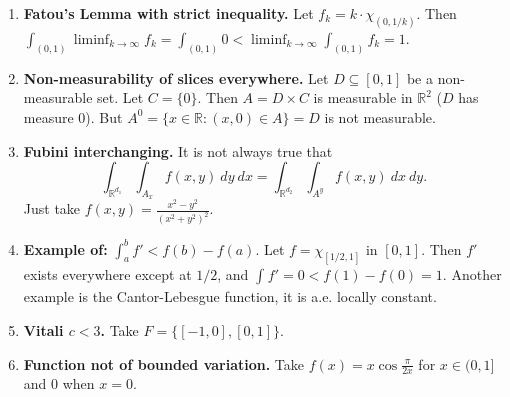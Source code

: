 \begin{enumerate}
	\item \textbf{Fatou's Lemma with strict inequality.} Let \( f_{k} = k \cdot \chi_{ (0, 1/k)} \). Then \( \int_{(0,1)} \liminf_{k \to \infty} f_{k} = \int_{(0,1)} 0 < \liminf_{k \to \infty} \int_{(0,1)} f_{k} = 1    \).
	\item \textbf{Non-measurability of slices everywhere.} Let \( D \subseteq [0,1] \) be a non-measurable set. Let \( C = \{ 0 \}  \). Then \( A = D \times C \) is measurable in \( \mathbb{R}^{2}  \) (\( D \) has measure 0). But \( A^{0} = \{ x \in \mathbb{R} : (x, 0) \in A \} = D  \) is not measurable.
	\item \textbf{Fubini interchanging.} It is not always true that \[\int_{\mathbb{R}^{d_1} } \int_{A_{x} } f(x,y) \ dy \ dx = \int_{\mathbb{R}^{d_2} } \int_{A^{y} } f(x,y)\ dx \ dy.   \] Just take \( f(x,y) = \frac{x^{2} - y^{2} }{(x^{2} + y^{2} )^{2} }  \).
	\item \textbf{Example of:} \( \int_{a} ^{b} f' < f(b) - f(a) \). Let \( f = \chi_{[1/2, 1]}  \) in \( [0,1] \). Then \( f' \) exists everywhere except at \( 1/2 \), and \( \int_{} f' = 0 < f(1) - f(0) = 1.\) Another example is the Cantor-Lebesgue function, it is a.e. locally constant. 
	\item \textbf{Vitali \( c < 3 \).} Take \( F = \{ [-1, 0], [0,1] \}  \).
	\item \textbf{Function not of bounded variation.} Take \( f(x) = x \cos \frac{\pi}{2x}  \) for \( x \in (0, 1] \) and \( 0 \) when \( x = 0 \).
	
	
	
	
	
	
	
	
	
	
	
	
\end{enumerate}

